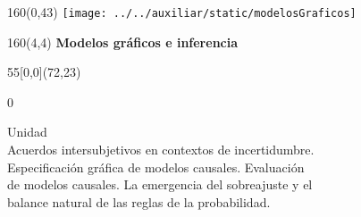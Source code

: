 \documentclass[shownotes,aspectratio=169]{beamer}
\newcounter{capitulo}
\newcommand{\unidad}{\thecapitulo \stepcounter{capitulo}}
\begin{document}
\begin{frame}
\begin{textblock}{160}(0,43)
\texttt{[image: ../../auxiliar/static/modelosGraficos]}
\end{textblock}


\begin{textblock}{160}(4,4)
\LARGE \textcolor{black!85}{\fontsize{22}{0}\selectfont \textbf{Modelos gráficos e inferencia}}
\end{textblock}


\begin{textblock}{55}[0,0](72,23)
\begin{turn}{0}
\parbox{10cm}{\sloppy\setlength\parfillskip{0pt}
\textcolor{black!85}{Unidad \unidad} \\
\small\textcolor{black!85}{Acuerdos intersubjetivos en contextos de incertidumbre.} \\
\small\textcolor{black!85}{Especificación gráfica de modelos causales. Evaluación} \\
\small\textcolor{black!85}{de modelos causales. La emergencia del sobreajuste y el} \\
\small\textcolor{black!85}{balance natural de las reglas de la probabilidad.} \\
}
\end{turn}
\end{textblock}

\end{frame}
\end{document}
